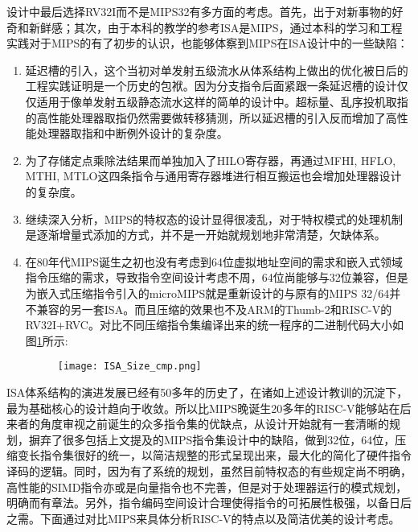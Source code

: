 设计中最后选择RV32I而不是MIPS32有多方面的考虑。首先，出于对新事物的好奇和新鲜感；其次，由于本科的教学的参考ISA是MIPS，通过本科的学习和工程实践对于MIPS的有了初步的认识，也能够体察到MIPS在ISA设计中的一些缺陷：
\begin{enumerate}[label=(\alph*)]
	\item 延迟槽的引入，这个当初对单发射五级流水从体系结构上做出的优化被日后的工程实践证明是一个历史的包袱。因为分支指令后面紧跟一条延迟槽的设计仅仅适用于像单发射五级静态流水这样的简单的设计中。超标量、乱序投机取指的高性能处理器取指仍然需要做转移猜测，所以延迟槽的引入反而增加了高性能处理器取指和中断例外设计的复杂度。
	\item 为了存储定点乘除法结果而单独加入了HILO寄存器，再通过MFHI, HFLO, MTHI, MTLO这四条指令与通用寄存器堆进行相互搬运也会增加处理器设计的复杂度。
	\item 继续深入分析，MIPS的特权态的设计显得很凌乱，对于特权模式的处理机制是逐渐增量式添加的方式，并不是一开始就规划地非常清楚，欠缺体系。
	\item 在80年代MIPS诞生之初也没有考虑到64位虚拟地址空间的需求和嵌入式领域指令压缩的需求，导致指令空间设计考虑不周，64位尚能够与32位兼容，但是为嵌入式压缩指令引入的microMIPS就是重新设计的与原有的MIPS 32/64并不兼容的另一套ISA。而且压缩的效果也不及ARM的Thumb-2和RISC-V的RV32I+RVC。对比不同压缩指令集编译出来的统一程序的二进制代码大小如图\ref{fig:sizecmp}所示:
	\begin{figure}[!htbp]
		\centering
		\texttt{[image: ISA\_Size\_cmp.png]}
		\label{fig:sizecmp}
	\end{figure}
\end{enumerate}

ISA体系结构的演进发展已经有50多年的历史了，在诸如上述设计教训的沉淀下，最为基础核心的设计趋向于收敛。所以比MIPS晚诞生20多年的RISC-V能够站在后来者的角度审视之前诞生的众多指令集的优缺点，从设计开始就有一套清晰的规划，摒弃了很多包括上文提及的MIPS指令集设计中的缺陷，做到32位，64位，压缩变长指令集很好的统一，以简洁规整的形式呈现出来，最大化的简化了硬件指令译码的逻辑。同时，因为有了系统的规划，虽然目前特权态的有些规定尚不明确，高性能的SIMD指令亦或是向量指令也不完善，但是对于处理器运行的模式规划，明确而有章法。另外，指令编码空间设计合理使得指令的可拓展性极强，以备日后之需。下面通过对比MIPS来具体分析RISC-V的特点以及简洁优美的设计考虑。

